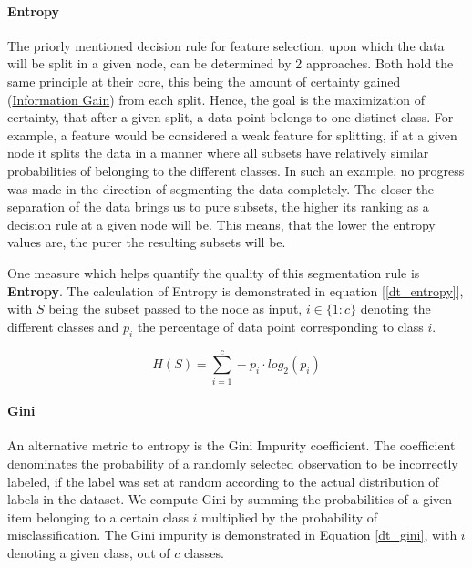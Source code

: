 	\paragraph{Entropy}
	\label{entropy}
		The priorly mentioned decision rule for feature selection, upon which the data will be split in a given node, can be determined by 2 approaches. Both hold the same principle at their core, this being the amount of certainty gained (\hyperref[info_gain]{Information Gain}) from each split. Hence, the goal is the maximization of certainty, that after a given split, a data point belongs to one distinct class. For example, a feature would be considered a weak feature for splitting, if at a given node it splits the data in a manner where all subsets have relatively similar probabilities of belonging to the different classes. In such an example, no progress was made in the direction of segmenting the data completely. The closer the separation of the data brings us to pure subsets, the higher its ranking as a decision rule at a given node will be. This means, that the lower the entropy values are, the purer the resulting subsets will be.
		
		\par
		One measure which helps quantify the quality of this segmentation rule is \textbf{Entropy}. The calculation of Entropy is demonstrated in equation [\ref{dt_entropy}], with $ S $ being the subset passed to the node as input, $ i \in \{1:c \} $ denoting the different classes and $ p_i $ the percentage of data point corresponding to class $ i $. 
		
		\begin{equation}
			H(S) = \sum_{i=1}^c - p_i \cdot log_2 (p_i)
			\label{dt_entropy}
		\end{equation}
		
	 \paragraph{Gini}
	 \label{gini}
	 	An alternative metric to entropy is the Gini Impurity coefficient. The coefficient denominates the probability of a randomly selected observation to be incorrectly labeled, if the label was set at random according to the actual distribution of labels in the dataset. We compute Gini by summing the probabilities of a given item belonging to a certain class $ i $ multiplied by the probability of misclassification. The Gini impurity is demonstrated in Equation \ref{dt_gini}, with $ i $ denoting a given class, out of $ c $ classes.
	 	
